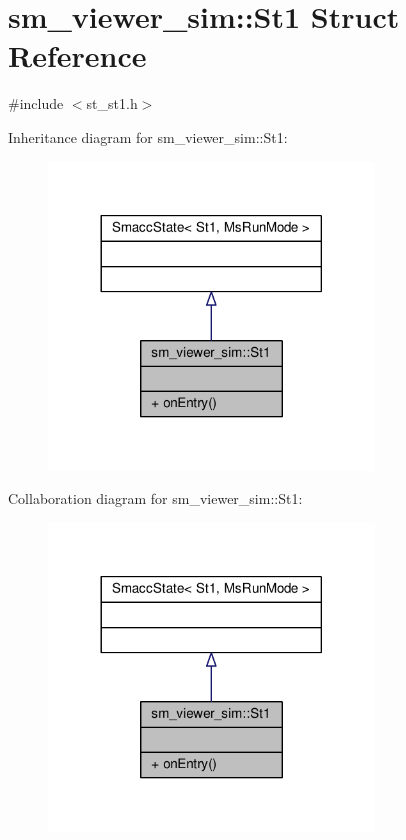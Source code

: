 \hypertarget{structsm__viewer__sim_1_1St1}{}\section{sm\+\_\+viewer\+\_\+sim\+:\+:St1 Struct Reference}
\label{structsm__viewer__sim_1_1St1}


{\ttfamily \#include $<$st\+\_\+st1.\+h$>$}



Inheritance diagram for sm\+\_\+viewer\+\_\+sim\+:\+:St1\+:\nopagebreak
\begin{figure}[H]
\begin{center}
\leavevmode
\includegraphics[width=245pt]{structsm__viewer__sim_1_1St1__inherit__graph}
\end{center}
\end{figure}


Collaboration diagram for sm\+\_\+viewer\+\_\+sim\+:\+:St1\+:\nopagebreak
\begin{figure}[H]
\begin{center}
\leavevmode
\includegraphics[width=245pt]{structsm__viewer__sim_1_1St1__coll__graph}
\end{center}
\end{figure}
